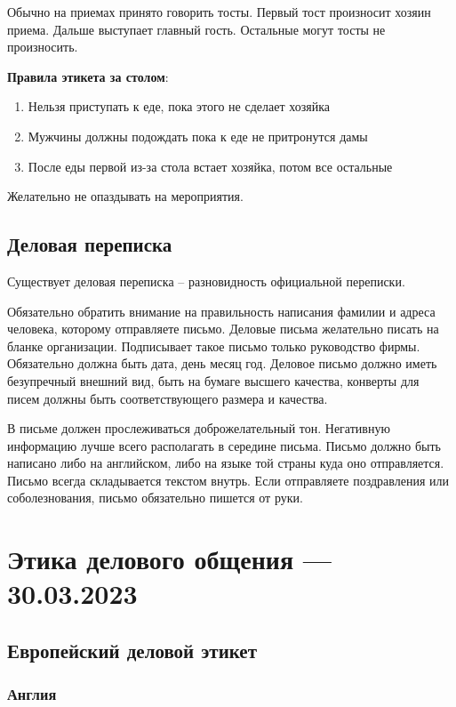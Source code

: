 \documentclass[a4paper,14pt]{extarticle}
\begin{document}
Обычно на приемах принято говорить тосты. Первый тост произносит хозяин приема. Дальше выступает главный гость. Остальные могут тосты не произносить.

\textbf{Правила этикета за столом}:

\begin{enumerate}
    \item Нельзя приступать к еде, пока этого не сделает хозяйка
    \item Мужчины должны подождать пока к еде не притронутся дамы
    \item После еды первой из-за стола встает хозяйка, потом все остальные
\end{enumerate}

Желательно не опаздывать на мероприятия.

\subsection{Деловая переписка}

Существует деловая переписка – разновидность официальной переписки.

Обязательно обратить внимание на правильность написания фамилии и
адреса человека, которому отправляете письмо. Деловые письма желательно писать на бланке организации. Подписывает такое письмо только руководство фирмы. Обязательно должна быть дата, день месяц год. Деловое письмо должно иметь безупречный внешний вид, быть на бумаге высшего качества, конверты для писем должны быть соответствующего размера и качества.

В письме должен прослеживаться доброжелательный тон. Негативную информацию лучше всего располагать в середине письма. Письмо должно быть написано либо на английском, либо на языке той страны куда оно отправляется. Письмо всегда складывается текстом внутрь. Если отправляете поздравления или соболезнования, письмо обязательно пишется от руки.

\section{Этика делового общения — 30.03.2023}

\subsection{Европейский деловой этикет}

\subsubsection{Англия}
\end{document}
